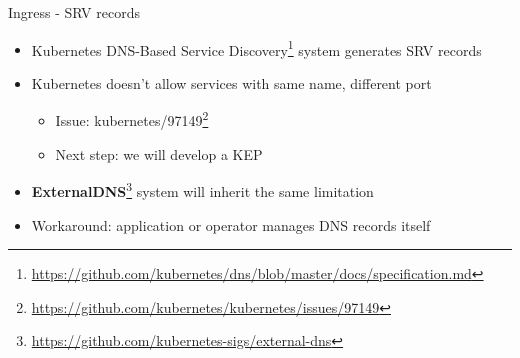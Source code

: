 \begin{frame}{Ingress - SRV records}
\protect\hypertarget{freeipa-openshift-ingress-srv}{}
\begin{itemize}

\item Kubernetes DNS-Based Service
  Discovery\footnote{\url{https://github.com/kubernetes/dns/blob/master/docs/specification.md}}
  system generates SRV records

\item Kubernetes doesn't allow services with same name, different port
  \begin{itemize}
  \item Issue: kubernetes/97149\footnote{\url{https://github.com/kubernetes/kubernetes/issues/97149}}
  \item Next step: we will develop a KEP
  \end{itemize}

\item {\bf ExternalDNS}\footnote{\url{https://github.com/kubernetes-sigs/external-dns}}
      system will inherit the same limitation

\item Workaround: application or operator manages DNS records itself

\end{itemize}
\end{frame}
